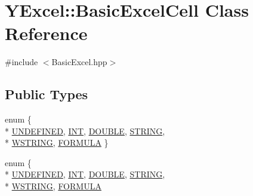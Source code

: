 \hypertarget{class_y_excel_1_1_basic_excel_cell}{}\section{Y\+Excel\+:\+:Basic\+Excel\+Cell Class Reference}
\label{class_y_excel_1_1_basic_excel_cell}


{\ttfamily \#include $<$Basic\+Excel.\+hpp$>$}

\subsection*{Public Types}
\begin{DoxyCompactItemize}
\item 
enum \{ \\*
\hyperlink{class_y_excel_1_1_basic_excel_cell_a25f76b4d6d3570cbc07ba1bc127324e4aeb4dc240ecb209695bb419afd2256a14}{U\+N\+D\+E\+F\+I\+N\+E\+D}, 
\hyperlink{class_y_excel_1_1_basic_excel_cell_a25f76b4d6d3570cbc07ba1bc127324e4aab5e78e3462dd0c981c2a0b281cb6c02}{I\+N\+T}, 
\hyperlink{class_y_excel_1_1_basic_excel_cell_a25f76b4d6d3570cbc07ba1bc127324e4a02d3620609aceae78e816278b6a794b9}{D\+O\+U\+B\+L\+E}, 
\hyperlink{class_y_excel_1_1_basic_excel_cell_a25f76b4d6d3570cbc07ba1bc127324e4a30aaabb18d90848134fc14b1af16e5b8}{S\+T\+R\+I\+N\+G}, 
\\*
\hyperlink{class_y_excel_1_1_basic_excel_cell_a25f76b4d6d3570cbc07ba1bc127324e4aee3a3e5be216cf72cda51b3e556d921e}{W\+S\+T\+R\+I\+N\+G}, 
\hyperlink{class_y_excel_1_1_basic_excel_cell_a25f76b4d6d3570cbc07ba1bc127324e4a109724fd363d37dbf95e6040c537206e}{F\+O\+R\+M\+U\+L\+A}
 \}
\item 
enum \{ \\*
\hyperlink{class_y_excel_1_1_basic_excel_cell_a25f76b4d6d3570cbc07ba1bc127324e4aeb4dc240ecb209695bb419afd2256a14}{U\+N\+D\+E\+F\+I\+N\+E\+D}, 
\hyperlink{class_y_excel_1_1_basic_excel_cell_a25f76b4d6d3570cbc07ba1bc127324e4aab5e78e3462dd0c981c2a0b281cb6c02}{I\+N\+T}, 
\hyperlink{class_y_excel_1_1_basic_excel_cell_a25f76b4d6d3570cbc07ba1bc127324e4a02d3620609aceae78e816278b6a794b9}{D\+O\+U\+B\+L\+E}, 
\hyperlink{class_y_excel_1_1_basic_excel_cell_a25f76b4d6d3570cbc07ba1bc127324e4a30aaabb18d90848134fc14b1af16e5b8}{S\+T\+R\+I\+N\+G}, 
\\*
\hyperlink{class_y_excel_1_1_basic_excel_cell_a25f76b4d6d3570cbc07ba1bc127324e4aee3a3e5be216cf72cda51b3e556d921e}{W\+S\+T\+R\+I\+N\+G}, 
\hyperlink{class_y_excel_1_1_basic_excel_cell_a25f76b4d6d3570cbc07ba1bc127324e4a109724fd363d37dbf95e6040c537206e}{F\+O\+R\+M\+U\+L\+A}

\end{DoxyCompactItemize}

